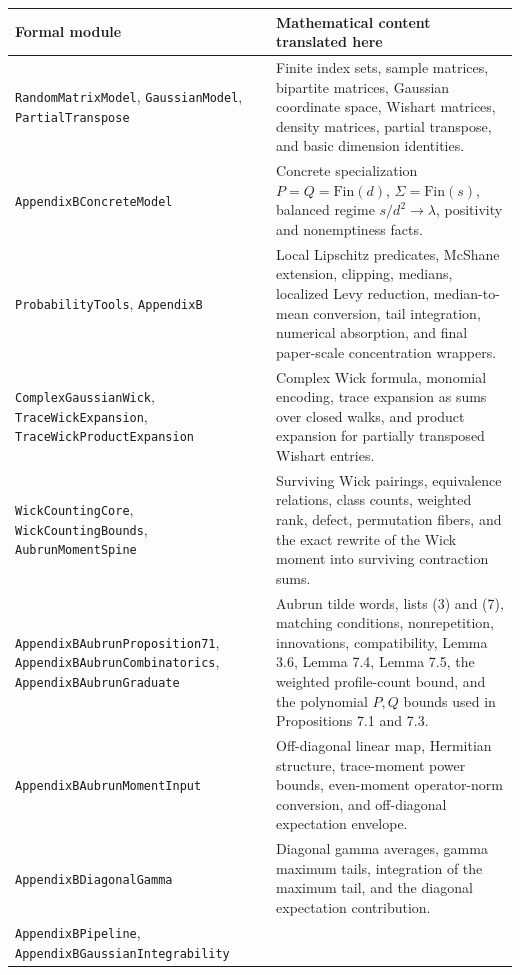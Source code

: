 \documentclass[11pt,oneside]{book}
\newcommand{\1}{\mathbf 1}
\newcommand{\leanfile}[1]{\begingroup\scriptsize\texttt{#1}\endgroup}
\begin{document}
\begin{longtable}{>{\raggedright\arraybackslash}p{}
                  >{\raggedright\arraybackslash}p{}}
\toprule
Formal module & Mathematical content translated here\\
\midrule
\endhead
\leanfile{RandomMatrixModel},
\leanfile{GaussianModel},
\leanfile{PartialTranspose} &
Finite index sets, sample matrices, bipartite matrices, Gaussian coordinate
space, Wishart matrices, density matrices, partial transpose, and basic
dimension identities.\\
\leanfile{AppendixBConcreteModel} &
Concrete specialization \(P=Q=\mathrm{Fin}(d)\), \(\Sigma=\mathrm{Fin}(s)\),
balanced regime \(s/d^2\to\lambda\), positivity and nonemptiness facts.\\
\leanfile{ProbabilityTools},
\leanfile{AppendixB} &
Local Lipschitz predicates, McShane extension, clipping, medians, localized
Levy reduction, median-to-mean conversion, tail integration, numerical
absorption, and final paper-scale concentration wrappers.\\
\leanfile{ComplexGaussianWick},
\leanfile{TraceWickExpansion},
\leanfile{TraceWickProductExpansion} &
Complex Wick formula, monomial encoding, trace expansion as sums over closed
walks, and product expansion for partially transposed Wishart entries.\\
\leanfile{WickCountingCore},
\leanfile{WickCountingBounds},
\leanfile{AubrunMomentSpine} &
Surviving Wick pairings, equivalence relations, class counts, weighted rank,
defect, permutation fibers, and the exact rewrite of the Wick moment into
surviving contraction sums.\\
\leanfile{AppendixBAubrunProposition71},
\leanfile{AppendixBAubrunCombinatorics},
\leanfile{AppendixBAubrunGraduate} &
Aubrun tilde words, lists (3) and (7), matching conditions, nonrepetition,
innovations, compatibility, Lemma 3.6, Lemma 7.4, Lemma 7.5, the weighted
profile-count bound, and the polynomial \(P,Q\) bounds used in Propositions
7.1 and 7.3.\\
\leanfile{AppendixBAubrunMomentInput} &
Off-diagonal linear map, Hermitian structure, trace-moment power bounds,
even-moment operator-norm conversion, and off-diagonal expectation envelope.\\
\leanfile{AppendixBDiagonalGamma} &
Diagonal gamma averages, gamma maximum tails, integration of the maximum
tail, and the diagonal expectation contribution.\\
\leanfile{AppendixBPipeline},
\leanfile{AppendixBGaussianIntegrability} &

\end{longtable}
\end{document}
